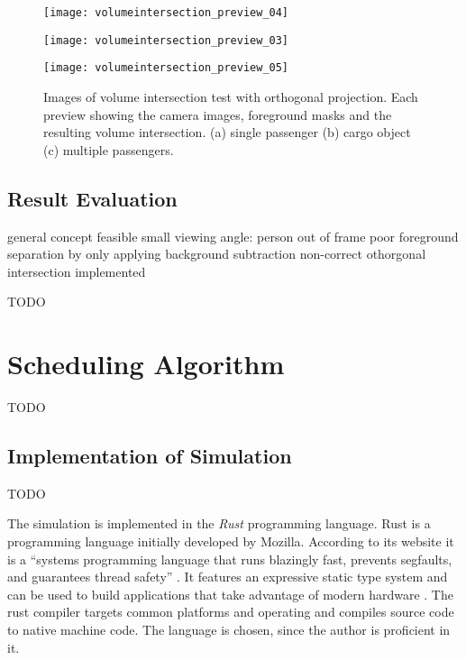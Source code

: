 \begin{figure}[p]
    \centering
    \texttt{[image: volumeintersection\_preview\_04]}
    
    \vspace{0.5em}
    
    \texttt{[image: volumeintersection\_preview\_03]}
    
    \vspace{0.5em}
    
    \texttt{[image: volumeintersection\_preview\_05]}
    
    \caption[Images of volume intersection test with orthogonal projection]{Images of volume intersection test with orthogonal projection. Each preview showing the camera images, foreground masks and the resulting volume intersection. (a) single passenger (b) cargo object (c) multiple passengers.}
    \label{fig:impl:preview}
\end{figure}

\subsection{Result Evaluation}
general concept feasible
small viewing angle: person out of frame
poor foreground separation by only applying background subtraction
non-correct othorgonal intersection implemented

TODO

\section{Scheduling Algorithm}
TODO
\subsection{Implementation of Simulation}

TODO

The simulation is implemented in the \emph{Rust} programming language.
Rust is a programming language initially developed by Mozilla.
According to its website it is a \enquote{systems programming language that runs blazingly fast, prevents segfaults, and guarantees thread safety} \autocite{rust2018rust}.
It features an expressive static type system and can be used to build applications that take advantage of modern hardware
\autocite[][]{matsakis2014rust}.
The rust compiler targets common platforms and operating and compiles source code to native machine code.
The language is chosen, since the author is proficient in it.

